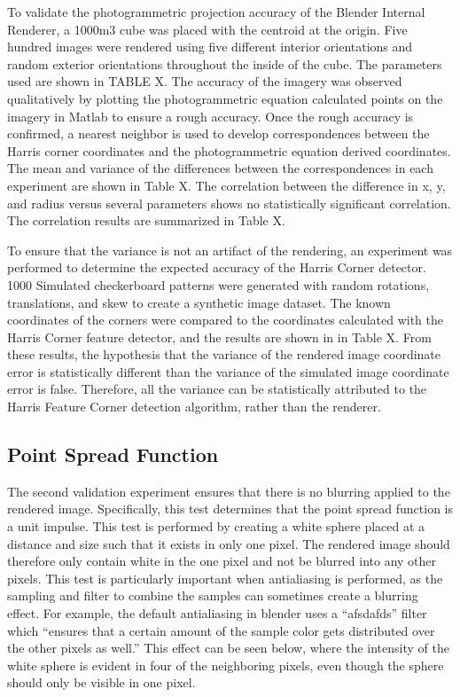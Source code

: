 To validate the photogrammetric projection accuracy of the Blender Internal Renderer, a 1000m3 cube was placed with the centroid at the origin.  Five hundred images were rendered using five different interior orientations and random exterior orientations throughout the inside of the cube.  The parameters used are shown in TABLE X.  The accuracy of the imagery was observed qualitatively by plotting the photogrammetric equation calculated points on the imagery in Matlab to ensure a rough accuracy.  Once the rough accuracy is confirmed, a nearest neighbor is used to develop correspondences between the Harris corner coordinates and the photogrammetric equation derived coordinates.  The mean and variance of the differences between the correspondences in each experiment are shown in Table X.  The correlation between the difference in x, y, and radius versus several parameters shows no statistically significant correlation.  The correlation results are summarized in Table X.

To ensure that the variance is not an artifact of the rendering, an experiment was performed to determine the expected accuracy of the Harris Corner detector.  1000 Simulated checkerboard patterns were generated with random rotations, translations, and skew to create a synthetic image dataset.  The known coordinates of the corners were compared to the coordinates calculated with the Harris Corner feature detector, and the results are shown in in Table X.  From these results, the hypothesis that the variance of the rendered image coordinate error is statistically different than the variance of the simulated image coordinate error is false.  Therefore, all the variance can be statistically attributed to the Harris Feature Corner detection algorithm, rather than the renderer. 

\subsection{Point Spread Function}
The second validation experiment ensures that there is no blurring applied to the rendered image.  Specifically, this test determines that the point spread function is a unit impulse.  This test is performed by creating a white sphere placed at a distance and size such that it exists in only one pixel.  The rendered image should therefore only contain white in the one pixel and not be blurred into any other pixels.  This test is particularly important when antialiasing is performed, as the sampling and filter to combine the samples can sometimes create a blurring effect.  For example, the default antialiasing in blender uses a “afsdafds” filter which “ensures that a certain amount of the sample color gets distributed over the other pixels as well.”  This effect can be seen below, where the intensity of the white sphere is evident in four of the neighboring pixels, even though the sphere should only be visible in one pixel.  

